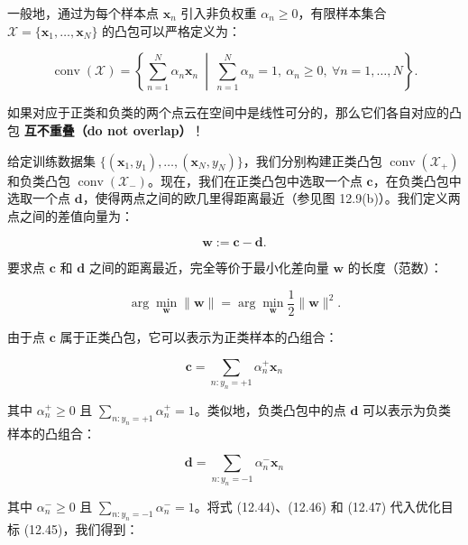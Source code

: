 一般地，通过为每个样本点 $ \boldsymbol{x}_n $ 引入非负权重 $ \alpha_n \geqslant 0 $，有限样本集合 $ \mathcal{X} = \{\boldsymbol{x}_1, \ldots, \boldsymbol{x}_N\} $ 的凸包可以严格定义为：

\begin{equation}
\operatorname{conv}(\mathcal{X}) = \left\{ \sum_{n=1}^N \alpha_n \boldsymbol{x}_n \ \middle|\ \sum_{n=1}^N \alpha_n = 1, \ \alpha_n \geqslant 0, \ \forall n = 1, \ldots, N \right\} .
\tag{12.43}
\end{equation}

如果对应于正类和负类的两个点云在空间中是线性可分的，那么它们各自对应的凸包 \textbf{互不重叠（do not overlap）}！

给定训练数据集 $ \{(\boldsymbol{x}_1, y_1), \ldots, (\boldsymbol{x}_N, y_N)\} $，我们分别构建正类凸包 $ \operatorname{conv}(\mathcal{X}_+) $ 和负类凸包 $ \operatorname{conv}(\mathcal{X}_-) $。现在，我们在正类凸包中选取一个点 $ \boldsymbol{c} $，在负类凸包中选取一个点 $ \boldsymbol{d} $，使得两点之间的欧几里得距离最近（参见图 12.9(b)）。我们定义两点之间的差值向量为：

\begin{equation}
\boldsymbol{w} := \boldsymbol{c} - \boldsymbol{d} .
\tag{12.44}
\end{equation}

要求点 $ \boldsymbol{c} $ 和 $ \boldsymbol{d} $ 之间的距离最近，完全等价于最小化差向量 $ \boldsymbol{w} $ 的长度（范数）：

\begin{equation}
\arg\min_{\boldsymbol{w}} \|\boldsymbol{w}\| = \arg\min_{\boldsymbol{w}} \frac{1}{2} \|\boldsymbol{w}\|^2 .
\tag{12.45}
\end{equation}

由于点 $ \boldsymbol{c} $ 属于正类凸包，它可以表示为正类样本的凸组合：

\begin{equation}
\boldsymbol{c} = \sum_{n: y_n = +1} \alpha_n^+ \boldsymbol{x}_n
\tag{12.46}
\end{equation}

其中 $ \alpha_n^+ \geqslant 0 $ 且 $ \sum_{n: y_n = +1} \alpha_n^+ = 1 $。类似地，负类凸包中的点 $ \boldsymbol{d} $ 可以表示为负类样本的凸组合：

\begin{equation}
\boldsymbol{d} = \sum_{n: y_n = -1} \alpha_n^- \boldsymbol{x}_n
\tag{12.47}
\end{equation}

其中 $ \alpha_n^- \geqslant 0 $ 且 $ \sum_{n: y_n = -1} \alpha_n^- = 1 $。将式 (12.44)、(12.46) 和 (12.47) 代入优化目标 (12.45)，我们得到：

